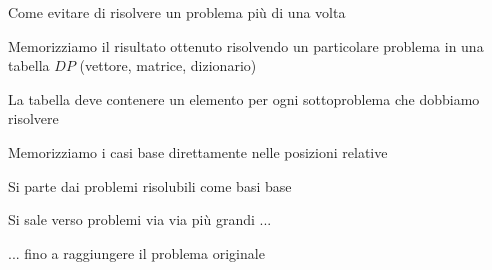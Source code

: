 \begin{frame}{Come evitare di risolvere un problema più di una volta}
  
\vspace{-9pt}
\begin{myboxtitle}[Tabella DP]
\BIL
\item Memorizziamo il risultato ottenuto risolvendo un particolare problema
in una \alert{tabella $\mathit{DP}$} (vettore, matrice, dizionario)
\item La tabella deve contenere un elemento per ogni sottoproblema che dobbiamo risolvere
\EIL
\end{myboxtitle}

\begin{myboxtitle}
\BIL
\item Memorizziamo i casi base direttamente nelle posizioni relative
\EIL
\end{myboxtitle}

\begin{myboxtitle}
\BIL
\item Si parte dai problemi risolubili come basi base
\item Si sale verso problemi via via più grandi ...
\item ... fino a raggiungere il problema originale
\EIL
\end{myboxtitle}

\end{frame}



